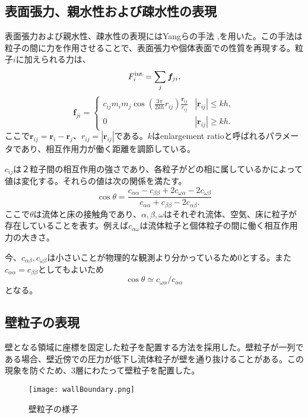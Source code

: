 \documentclass[]{jsarticle}
\begin{document}
\subsection{表面張力、親水性および疎水性の表現}
表面張力および親水性、疎水性の表現にはYangらの手法 \cite{Yang2016},\cite{Yang2017}を用いた。この手法は粒子の間に力を作用させることで、表面張力や個体表面での性質を再現する。粒子$i$に加えられる力は、
\begin{equation}
F^{\rm{int}}_i=\sum_{j} \bm{f}_{ji},
\end{equation}
\begin{equation}
  \bm{f}_{ji}=\begin{cases}
    c_{ij}m_im_j\cos\left(\frac{3\pi}{2kh}r_{ij}\right)\frac{\bm{r}_{ij}}{r_{ij}} & \text{$|\bm{r}_{ij}|\leq kh,$}\\
    0 & \text{$|\bm{r}_{ij}|\geq kh.$}
\end{cases}
\end{equation}
ここで$\bm{r}_{ij}=\bm{r}_i-\bm{r}_{j}$、$r_{ij}=|\bm{r}_{ij}|$である。$k$はenlargement ratioと呼ばれるパラメータであり、相互作用力が働く距離を調節している。

$c_{ij}$は２粒子間の相互作用の強さであり、各粒子がどの相に属しているかによって値は変化する。それらの値は次の関係を満たす。
\begin{equation}
\cos\theta=\frac{c_{\alpha\alpha}-c_{\beta\beta}+2c_{\omega\alpha}-2c_{\omega\beta}}{c_{\alpha\alpha} +c_{\beta\beta} -2c_{\alpha\beta}.}
\end{equation}
ここで$\theta$は流体と床の接触角であり、$\alpha,\beta,\omega$はそれぞれ流体、空気、床に粒子が存在していることを表す。例えば$c_{\alpha\omega}$は流体粒子と個体粒子の間に働く相互作用力の大きさ。

今、$c_{\alpha\beta},c_{\omega\beta}$は小さいことが物理的な観測より分かっているため0とする。また$c_{\alpha\alpha}=c_{\beta\beta}$としてもよいため
\begin{equation}
\cos\theta\simeq c_{\omega\alpha}/c_{\alpha\alpha}
\end{equation}
となる。

\subsection{壁粒子の表現}
壁となる領域に座標を固定した粒子を配置する方法を採用した。壁粒子が一列である場合、壁近傍での圧力が低下し流体粒子が壁を通り抜けることがある。この現象を防ぐため、3層にわたって壁粒子を配置した。
\begin{figure}[H]
  \centering
  \texttt{[image: wallBoundary.png]}
  \caption{壁粒子の様子}
  \label{fig:wallParticles} 
\end{figure}
\end{document}
